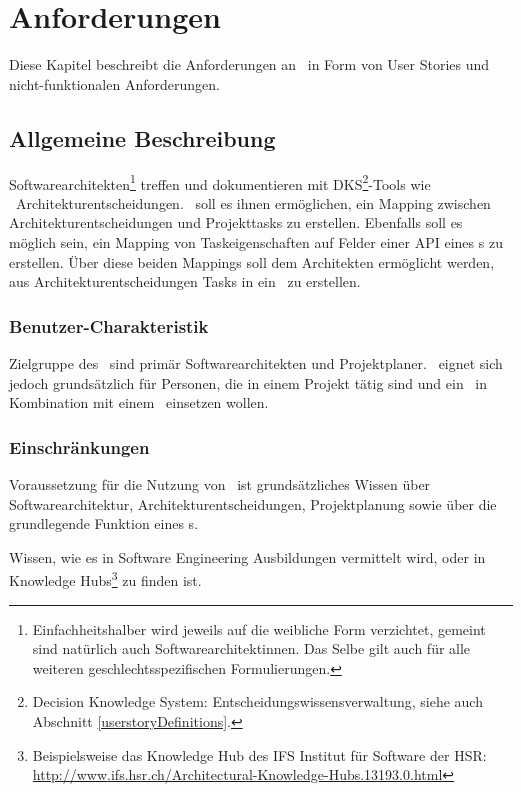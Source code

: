 \chapter{Anforderungen}

Diese Kapitel beschreibt die Anforderungen an \eeppi\ in Form von User Stories und nicht-funktionalen Anforderungen.

\section{Allgemeine Beschreibung}

Softwarearchitekten\footnote{Einfachheitshalber wird jeweils auf die weibliche Form verzichtet, gemeint sind natürlich auch Softwarearchitektinnen. Das Selbe gilt auch für alle weiteren geschlechtsspezifischen Formulierungen.} treffen und dokumentieren mit DKS\footnote{Decision Knowledge System: Entscheidungswissensverwaltung, siehe auch Abschnitt \ref{userstoryDefinitions}.}-Tools wie \cdar\ Architekturentscheidungen.
\eeppi\ soll es ihnen ermöglichen, ein Mapping zwischen Architekturentscheidungen und Projekttasks zu erstellen.
Ebenfalls soll es möglich sein, ein Mapping von Taskeigenschaften auf Felder einer API eines \ppt s zu erstellen.
Über diese beiden Mappings soll dem Architekten ermöglicht werden, aus Architekturentscheidungen Tasks in ein \ppt\ zu erstellen.

\subsection{Benutzer-Charakteristik}
Zielgruppe des \eeppi\ sind primär Softwarearchitekten und Projektplaner. \eeppi\ eignet sich jedoch grundsätzlich für Personen, die in einem Projekt tätig sind und ein \dks\ in Kombination mit einem \ppt\ einsetzen wollen.

\subsection{Einschränkungen}
Voraussetzung für die Nutzung von \eeppi\ ist grundsätzliches Wissen über Softwarearchitektur, Architekturentscheidungen, Projektplanung sowie über die grundlegende Funktion eines \ppt s.

Wissen, wie es in Software Engineering Ausbildungen vermittelt wird,
oder in Knowledge Hubs\footnote{Beispielsweise das Knowledge Hub des IFS Institut für Software der HSR: \url{http://www.ifs.hsr.ch/Architectural-Knowledge-Hubs.13193.0.html}} zu finden ist.